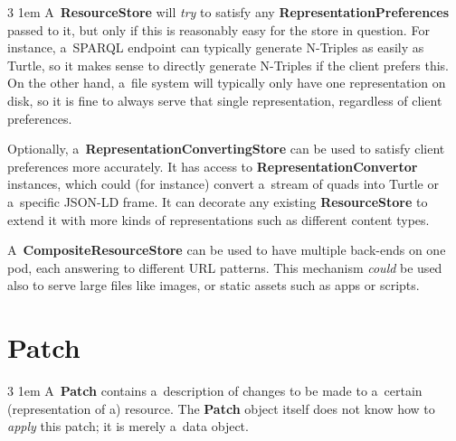 \documentclass[10pt]{article}
\newenvironment{Note}
  {\begin{multicols}{3}%
     \parskip 1em}
  {\end{multicols}}
\begin{document}

\bigskip

\begin{Note}
A~\textbf{ResourceStore} will \emph{try} to satisfy
any \textbf{RepresentationPreferences} passed to it,
but only if this is reasonably easy for the store in question.
For instance, a~SPARQL endpoint can typically
generate N-Triples as easily as Turtle,
so it makes sense to directly generate N-Triples
if the client prefers this.
On the other hand,
a~file system will typically only have one representation on disk,
so it is fine to always serve that single representation,
regardless of client preferences.
\columnbreak

Optionally, a~\textbf{RepresentationConvertingStore} can be used
to satisfy client preferences more accurately.
It has access to \textbf{RepresentationConvertor} instances,
which could (for instance) convert a~stream of quads
into Turtle or a~specific JSON-LD frame.
It can decorate any existing \textbf{ResourceStore}
to extend it with more kinds of representations
such as different content types.
\columnbreak

A~\textbf{CompositeResourceStore} can be used
to have multiple back-ends on one pod,
each answering to different URL patterns.
This mechanism \emph{could} be used
also to serve large files like images,
or static assets such as apps or scripts.
\end{Note}

\clearpage

\section*{Patch}
\begin{Note}
A~\textbf{Patch} contains a~description
of changes to be made to a~certain
(representation of a) resource.
The \textbf{Patch} object itself
does not know how to \emph{apply} this patch;
it is merely a~data object.
\columnbreak

\null
\columnbreak

\null
\end{Note}
\end{document}
